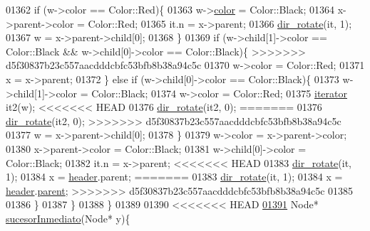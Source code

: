 \begin{DoxyCode}
01362             \textcolor{keywordflow}{if} (w->color == Color::Red)\{
01363                 w->\hyperlink{structaed2_1_1map_1_1Node_a58dd9993fee8ee3eaa5716b72a3eca47_a58dd9993fee8ee3eaa5716b72a3eca47}{color} = Color::Black;
01364                 x->parent->color = Color::Red;
01365                 it.n = x->parent;
01366                 \hyperlink{classaed2_1_1map_a94f2862ada0c9ed4f4457eac42ea8f23_a94f2862ada0c9ed4f4457eac42ea8f23}{dir\_rotate}(it, 1);
01367                 w = x->parent->child[0];
01368             \}
01369             \textcolor{keywordflow}{if} (w->child[1]->color == Color::Black && w->child[0]->color == Color::Black)\{
>>>>>>> d5f30837b23c557aacdddcbfc53bfb8b38a94c5c
01370                 w->color = Color::Red;
01371                 x = x->parent;
01372             \} \textcolor{keywordflow}{else} \textcolor{keywordflow}{if} (w->child[0]->color == Color::Black)\{
01373                 w->child[1]->color = Color::Black;
01374                 w->color = Color::Red;
01375                 \hyperlink{classaed2_1_1iterator}{iterator} it2(w);
<<<<<<< HEAD
01376                 \hyperlink{classaed2_1_1map_a94f2862ada0c9ed4f4457eac42ea8f23_a94f2862ada0c9ed4f4457eac42ea8f23}{dir_rotate}(it2, 0);
=======
01376                 \hyperlink{classaed2_1_1map_a94f2862ada0c9ed4f4457eac42ea8f23_a94f2862ada0c9ed4f4457eac42ea8f23}{dir\_rotate}(it2, 0);
>>>>>>> d5f30837b23c557aacdddcbfc53bfb8b38a94c5c
01377                 w = x->parent->child[0];
01378             \}
01379             w->color = x->parent->color;
01380             x->parent->color = Color::Black;
01381             w->child[0]->color = Color::Black;
01382             it.n = x->parent;
<<<<<<< HEAD
01383             \hyperlink{classaed2_1_1map_a94f2862ada0c9ed4f4457eac42ea8f23_a94f2862ada0c9ed4f4457eac42ea8f23}{dir_rotate}(it, 1);
01384             x = \hyperlink{classaed2_1_1map_a92d93f905c8ad73fba18fdc7e8915cce_a92d93f905c8ad73fba18fdc7e8915cce}{header}.parent;
=======
01383             \hyperlink{classaed2_1_1map_a94f2862ada0c9ed4f4457eac42ea8f23_a94f2862ada0c9ed4f4457eac42ea8f23}{dir\_rotate}(it, 1);
01384             x = \hyperlink{classaed2_1_1map_a92d93f905c8ad73fba18fdc7e8915cce_a92d93f905c8ad73fba18fdc7e8915cce}{header}.\hyperlink{structaed2_1_1map_1_1Node_a91a1855da19d22344bc89c2f8b998a7a_a91a1855da19d22344bc89c2f8b998a7a}{parent};
>>>>>>> d5f30837b23c557aacdddcbfc53bfb8b38a94c5c
01385 
01386         \}
01387 \}
01388 \}
01389 
01390 
<<<<<<< HEAD
\hypertarget{map3_8h_source_l01391}{}\hyperlink{classaed2_1_1map_a51169c7d557dc5cf26eac59e6e5e6d98_a51169c7d557dc5cf26eac59e6e5e6d98}{01391} Node* \hyperlink{classaed2_1_1map_a51169c7d557dc5cf26eac59e6e5e6d98_a51169c7d557dc5cf26eac59e6e5e6d98}{sucesorInmediato}(Node* y)\{

\end{DoxyCode}
